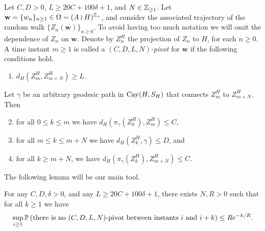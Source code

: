 \begin{defin}
	Let $C,D>0$, $L\ge 20C+100\delta+1$, and $N\in \Z_{\ge 1}$. Let $\mathbf{w}=\{w_n\}_{n\ge 1} \in \Omega=(A\wr H)^{\Z_{+}}$, and consider the associated trajectory of the random walk $\{Z_n(\mathbf{w})\}_{n\ge 0}$. To avoid having too much notation we will omit the dependence of $Z_n$ on $\mathbf{w}$. Denote by $Z_n^{H}$ the projection of $Z_n$ to $H$, for each $n\ge 0$. A time instant $m\ge 1$ is called a \emph{$(C,D,L,N)$-pivot} for $\mathbf{w}$ if the following conditions hold. 
	\begin{enumerate}
		\item $d_{H}\left(Z^{H}_m,Z^{H}_{m+N}\right)\ge L$.
	\end{enumerate}

 Let $\gamma$ be an arbitrary geodesic path in $\cay{H}{S_H}$ that connects $Z^{H}_m$ to $Z^{H}_{m+N}.$ Then 
 
	\begin{enumerate}\setcounter{enumi}{1}
	\item for all $0\le k \le m$ we have $d_H\left( \pi_{\gamma}\left(Z^{H}_k\right),Z^{H}_m \right)\le C$,
	\item for all $m\le k\le m+N$ we have $d_H\left(Z^{H}_k, \gamma \right)\le D$, and
	\item for all $k\ge m+N$, we have $d_H\left( \pi_{\gamma}\left(Z_k^H \right), Z^{H}_{m+N} \right)\le C$.
\end{enumerate}
\end{defin}

The following lemma will be our main tool.

\begin{lem}\label{lem: exp decay of pivot waiting time}
	For any $C, D, \delta>0$, and any $L\ge 20C+100\delta+1$, there exists $N,R>0$  such that for all $k\ge 1$ we have
	\[
	\sup_{i\ge 1}\P\left(\text{there is no } (C,D,L,N)\text{-pivot}\text{ between instants }i\text{ and }i+k\right)\le Re^{-k/R}.
	\]

\end{lem}



